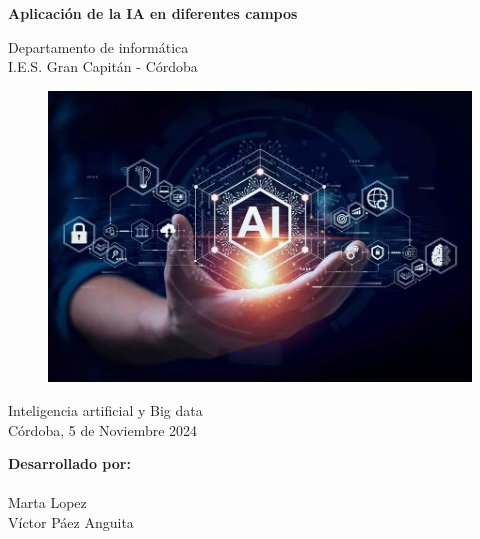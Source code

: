 \documentclass[12pt]{article}
\begin{document}
\begin{titlepage}
    \begin{center}
      \Large \bfseries{}
    \end{center}
    \vspace{0.1cm}
    \begin{center}
      \Large \bfseries{}
    \end{center}
    \vspace{0.1cm}
    \begin{center}
     \Large \bfseries{Aplicación de la IA en diferentes campos}
    \end{center}
    \vspace{0.0001cm}
    \begin{center}
        Departamento de informática \\ I.E.S. Gran Capitán - Córdoba
    \end{center}
        \vspace{2 cm}
\begin{figure}[h!]
    \centering
    \includegraphics[width=.6\textwidth]{ramas_ia_1.jpg}
    \label{fig:my_label}
\end{figure}
    \vspace{0.2 cm}
    \begin{center}
        Inteligencia artificial y Big data \\ Córdoba, 5 de Noviembre 2024
    \end{center}
    \vspace{5 cm}
\null\hfill \textbf{Desarrollado por:}
\\
\\
\null\hfill Marta Lopez
\\
\null\hfill Víctor Páez Anguita
\clearpage
\end{titlepage}

\tableofcontents
\clearpage
\end{document}
